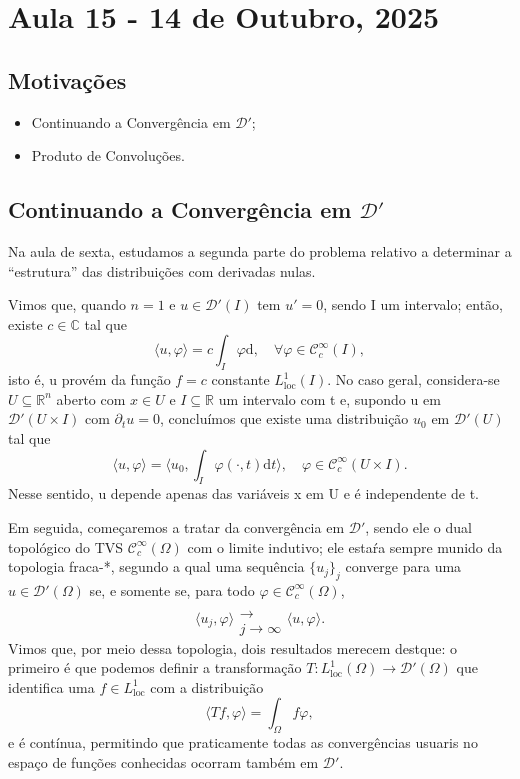 \documentclass[../distribution_theory_notes.tex]{subfiles}
\begin{document}
\section{Aula 15 - 14 de Outubro, 2025}
\subsection{Motivações}
\begin{itemize}
	\item Continuando a Convergência em \(\mathcal{D}'\);
	\item Produto de Convoluções.
\end{itemize}
\subsection{Continuando a Convergência em \(\mathcal{D}'\)}
Na aula de sexta, estudamos a segunda parte do problema relativo a determinar a ``estrutura'' das distribuições com derivadas nulas.

Vimos que, quando \(n=1\) e \(u\in \mathcal{D}'(I)\) tem \(u'=0\), sendo I um intervalo; então, existe \(c\in \mathbb{C}\) tal que
\[
	\langle u, \varphi  \rangle = c \int_{I}^{}\varphi  \mathrm{d}, \quad \forall \varphi \in \mathcal{C}_{c}^{\infty}(I),
\]
isto é, u provém da função \(f=c\) constante \(L_{\mathrm{loc}}^{1}(I)\). No caso geral, considera-se \(U\subseteq \mathbb{R}^{n}\)
aberto com \(x\in U\) e \(I\subseteq \mathbb{R}\) um intervalo com t e, supondo u em \(\mathcal{D}'(U\times I)\) com \(\partial_t u = 0\),
concluímos que existe uma distribuição \(u_{0}\) em \(\mathcal{D}'(U)\) tal que
\[
	\langle u, \varphi  \rangle = \biggl\langle u_{0}, \int_{I}^{}\varphi (\cdot , t) \mathrm{d}t \biggr\rangle,\quad \varphi \in \mathcal{C}_{c}^{\infty}(U\times I).
\]
Nesse sentido, u depende apenas das variáveis x em U e é independente de t.

Em seguida, começaremos a tratar da convergência em \(\mathcal{D}'\), sendo ele o dual topológico do TVS \(\mathcal{C}_{c}^{\infty}(\Omega )\) com o limite indutivo; ele estaŕa sempre munido da topologia fraca-*, segundo a qual uma sequência \(\{u_{j}\}_{j}\) converge
para uma \(u\in \mathcal{D}'(\Omega )\) se, e somente se, para todo \(\varphi \in \mathcal{C}_{c}^{\infty}(\Omega )\),
\[
	\langle u_{j}, \varphi  \rangle \substack{ \\ \longrightarrow \\ j\to \infty}\langle u, \varphi  \rangle.
\]
Vimos que, por meio dessa topologia, dois resultados merecem destque: o primeiro é que podemos definir a transformação \(T:L_{\mathrm{loc}}^{1}(\Omega )\rightarrow \mathcal{D}'(\Omega )\) que identifica uma \(f\in L_{\mathrm{loc}}^{1}\) com a distribuição
\[
	\langle Tf, \varphi  \rangle = \int_{\Omega }^{}f\varphi,
\]
e é contínua, permitindo que praticamente todas as convergências usuaris no espaço de funções conhecidas ocorram também em \(\mathcal{D}'.\)
\end{document}
